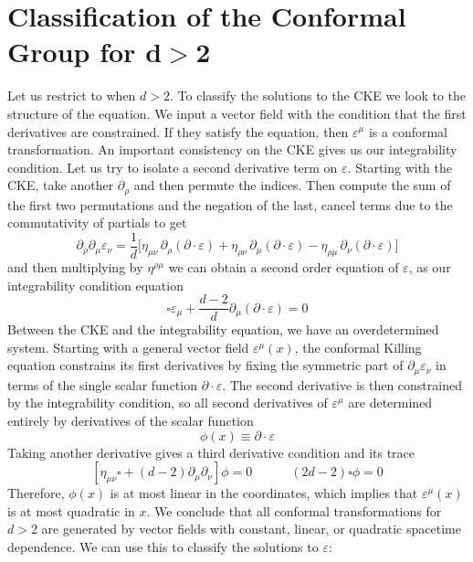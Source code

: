 \documentclass{article}
\begin{document}
\section{Classification of the Conformal Group for $\mathbf{d > 2}$}
Let us restrict to when $d > 2$. To classify the solutions to the CKE we look to the structure of the equation. We input a vector field with the condition that the first derivatives are constrained. If they satisfy the equation, then $\varepsilon^\mu$ is a conformal transformation. An important consistency on the CKE gives us our integrability condition. Let us try to isolate a second derivative term on $\varepsilon$. Starting with the CKE, take another $\partial_\rho$ and then permute the indices. Then compute the sum of the first two permutations and the negation of the last, cancel terms due to the commutativity of partials to get
\begin{equation}
\partial_\rho \partial_\mu \varepsilon_\nu
=
\frac{1}{d}\Big[
\eta_{\mu\nu}\,\partial_\rho(\partial\cdot\varepsilon)
+
\eta_{\rho\nu}\,\partial_\mu(\partial\cdot\varepsilon)
-
\eta_{\rho\mu}\,\partial_\nu(\partial\cdot\varepsilon)
\Big]
\end{equation}
and then multiplying by $\eta^{\rho\mu}$ we can obtain a second order equation of $\varepsilon$, as our integrability condition equation
\begin{equation}
\boxed{\square\varepsilon_\mu + \frac{d-2}{d}\partial_\mu (\partial\cdot\varepsilon) = 0}
\end{equation}
Between the CKE and the integrability equation, we have an overdetermined system. Starting with a general vector field $\varepsilon^\mu(x)$, the conformal Killing equation constrains its first derivatives by fixing the symmetric part of $\partial_\mu \varepsilon_\nu$ in terms of the single scalar function $\partial \cdot \varepsilon$. The second derivative is then constrained by the integrability condition, so all second derivatives of $\varepsilon^\mu$ are determined entirely by derivatives of the scalar function
\[
\phi(x)\equiv \partial\cdot\varepsilon
\]
Taking another derivative gives a third derivative condition and its trace
\begin{equation}
\left[\eta_{\mu\nu}\square + (d-2)\partial_\mu\partial_\nu\right]\phi = 0
\qquad \quad
(2d-2)\square\phi = 0
\end{equation}
Therefore, $\phi(x)$ is at most linear in the coordinates, which implies that $\varepsilon^\mu(x)$ is at most quadratic in $x$. We conclude that all conformal transformations for $ d> 2$ are generated by vector fields with constant, linear, or quadratic spacetime dependence. We can use this to classify the solutions to $\varepsilon$: 
\end{document}

